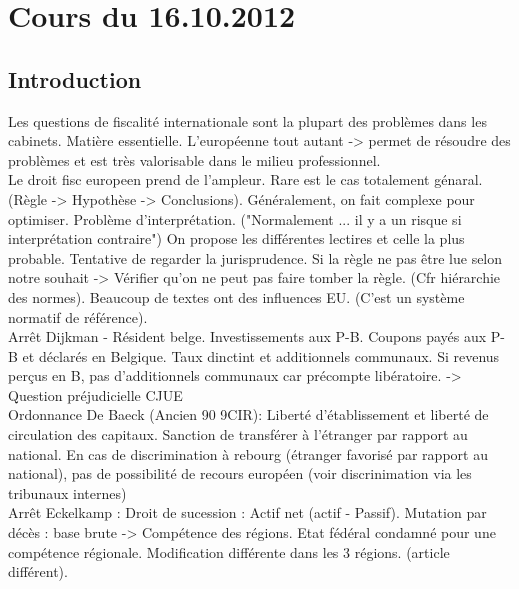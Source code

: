 \documentclass{book}
\begin{document}
\thispagestyle{empty}
\setcounter{page}{0}
\null
\newpage
{} \setcounter{page}{1} 




\tableofcontents



\chapter{Cours du 16.10.2012}
 \setcounter{page}{1} 

\section{Introduction}

Les questions de fiscalité internationale sont la plupart des problèmes dans les cabinets. Matière essentielle. L'européenne tout autant -> permet de résoudre des problèmes et est très valorisable dans le milieu professionnel.\\

Le droit fisc europeen prend de l'ampleur. Rare est le cas totalement génaral. (Règle -> Hypothèse -> Conclusions). Généralement, on fait complexe pour optimiser. Problème d'interprétation. ("Normalement ... il y a un risque si interprétation contraire") On propose les différentes lectires et celle la plus probable. Tentative de regarder la jurisprudence. Si la règle ne pas être lue selon notre souhait -> Vérifier qu'on ne peut pas faire tomber la règle. (Cfr hiérarchie des normes). Beaucoup de textes ont des influences EU. (C'est un système normatif de référence).\\

Arrêt Dijkman - Résident belge. Investissements aux P-B. Coupons payés aux P-B et déclarés en Belgique. Taux dinctint et additionnels communaux. Si revenus perçus en B, pas d'additionnels communaux car précompte libératoire. -> Question préjudicielle CJUE\\

Ordonnance De Baeck (Ancien 90 9\degre CIR): Liberté d'établissement et liberté de circulation des capitaux. Sanction de transférer à l'étranger par rapport au national. En cas de discrimination à rebourg (étranger favorisé par rapport au national), pas de possibilité de recours européen (voir discrinimation via les tribunaux internes)\\

Arrêt Eckelkamp : Droit de sucession : Actif net (actif - Passif). Mutation par décès : base brute -> Compétence des régions. Etat fédéral condamné pour une compétence régionale. Modification différente dans les 3 régions. (article différent). \\
\end{document}
